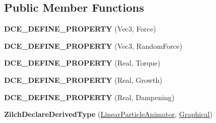 \subsection*{Public Member Functions}
\begin{DoxyCompactItemize}
\item 
\hypertarget{classDCEngine_1_1Components_1_1LinearParticleAnimator_a1dc9d506872b78bf2dc1b60bd01aea38}{{\bfseries D\-C\-E\-\_\-\-D\-E\-F\-I\-N\-E\-\_\-\-P\-R\-O\-P\-E\-R\-T\-Y} (Vec3, Force)}\label{classDCEngine_1_1Components_1_1LinearParticleAnimator_a1dc9d506872b78bf2dc1b60bd01aea38}

\item 
\hypertarget{classDCEngine_1_1Components_1_1LinearParticleAnimator_a64f3d392e07a3666e9c444511b60cd9e}{{\bfseries D\-C\-E\-\_\-\-D\-E\-F\-I\-N\-E\-\_\-\-P\-R\-O\-P\-E\-R\-T\-Y} (Vec3, Random\-Force)}\label{classDCEngine_1_1Components_1_1LinearParticleAnimator_a64f3d392e07a3666e9c444511b60cd9e}

\item 
\hypertarget{classDCEngine_1_1Components_1_1LinearParticleAnimator_a94648cde5c2449814d048aec9dbcf21b}{{\bfseries D\-C\-E\-\_\-\-D\-E\-F\-I\-N\-E\-\_\-\-P\-R\-O\-P\-E\-R\-T\-Y} (Real, Torque)}\label{classDCEngine_1_1Components_1_1LinearParticleAnimator_a94648cde5c2449814d048aec9dbcf21b}

\item 
\hypertarget{classDCEngine_1_1Components_1_1LinearParticleAnimator_a32bc83810b6a1ba0c0d4443040c439d5}{{\bfseries D\-C\-E\-\_\-\-D\-E\-F\-I\-N\-E\-\_\-\-P\-R\-O\-P\-E\-R\-T\-Y} (Real, Growth)}\label{classDCEngine_1_1Components_1_1LinearParticleAnimator_a32bc83810b6a1ba0c0d4443040c439d5}

\item 
\hypertarget{classDCEngine_1_1Components_1_1LinearParticleAnimator_a1bb5cc102fd2f34245380cdd86bb91b7}{{\bfseries D\-C\-E\-\_\-\-D\-E\-F\-I\-N\-E\-\_\-\-P\-R\-O\-P\-E\-R\-T\-Y} (Real, Dampening)}\label{classDCEngine_1_1Components_1_1LinearParticleAnimator_a1bb5cc102fd2f34245380cdd86bb91b7}

\item 
\hypertarget{classDCEngine_1_1Components_1_1LinearParticleAnimator_a4ae40786338c8751815c68688b0c5736}{{\bfseries Zilch\-Declare\-Derived\-Type} (\hyperlink{classDCEngine_1_1Components_1_1LinearParticleAnimator}{Linear\-Particle\-Animator}, \hyperlink{classDCEngine_1_1Components_1_1Graphical}{Graphical})}\label{classDCEngine_1_1Components_1_1LinearParticleAnimator_a4ae40786338c8751815c68688b0c5736}


\end{DoxyCompactItemize}
